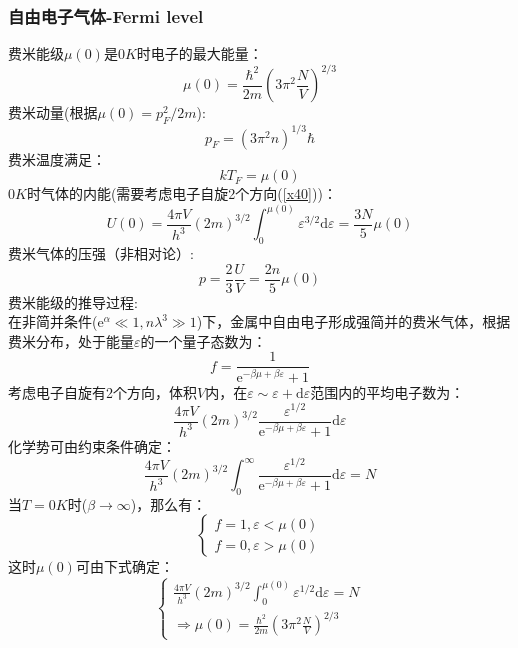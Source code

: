 \documentclass[12pt]{article}
\begin{document}
\subsubsection{自由电子气体-Fermi level}
\noindent
费米能级$\mu(0)$是$0K$时电子的最大能量：
\begin{equation}
	\mu(0)=\frac{\hbar^2}{2m}(3\pi^2\frac{N}{V})^{2/3}
\end{equation}
费米动量(根据$\mu(0)=p_F^2/2m$):
\begin{equation}
	p_F=(3\pi^2n)^{1/3}\hbar
\end{equation}
费米温度满足：
\begin{equation}
	kT_F=\mu(0)
\end{equation}
$0K$时气体的内能(需要考虑电子自旋2个方向(\ref{x40}))：
\begin{equation}
	U(0)=\frac{4\pi V}{h^3}(2m)^{3/2}\int_{0}^{\mu(0)} \varepsilon^{3/2}\mathrm{d}\varepsilon=\frac{3N}{5}\mu(0)
\end{equation}
费米气体的压强（非相对论）:
\begin{equation}
	p=\frac{2}{3}\frac{U}{V}=\frac{2n}{5}\mu(0)
\end{equation}
费米能级的推导过程:\\
在非简并条件($\mathrm{e}^\alpha\ll1, n\lambda^3\gg1$)下，金属中自由电子形成强简并的费米气体，根据费米分布，处于能量$\varepsilon$的一个量子态数为：
\begin{equation}
	f=\frac{1}{\mathrm{e}^{-\beta\mu+\beta\varepsilon}+1}
\end{equation}
考虑电子自旋有2个方向，体积$V$内，在$\varepsilon\sim\varepsilon+\mathrm{d}\varepsilon$范围内的平均电子数为：
\begin{equation}
	\frac{4\pi V}{h^3}(2m)^{3/2}\frac{\varepsilon^{1/2}}{\mathrm{e}^{-\beta\mu+\beta\varepsilon}+1}\mathrm{d}\varepsilon
\end{equation}
化学势可由约束条件确定：
\begin{equation}
		\frac{4\pi V}{h^3}(2m)^{3/2}\int_{0}^{\infty}\frac{\varepsilon^{1/2}}{\mathrm{e}^{-\beta\mu+\beta\varepsilon}+1}\mathrm{d}\varepsilon=N
\end{equation}
当$T=0K$时($\beta\to \infty$)，那么有：
\begin{equation}
	\left \{\begin{split}
		f=1,\varepsilon<\mu(0)\\
		f=0,\varepsilon>\mu(0)
	\end{split}\right.
\end{equation}
这时$\mu(0)$可由下式确定：
\begin{equation}
	\left\{
	\begin{split}
	\frac{4\pi V}{h^3}(2m)^{3/2}\int_{0}^{\mu(0)}{\varepsilon^{1/2}}\mathrm{d}\varepsilon=N\\
	\Rightarrow \mu(0)=\frac{\hbar^2}{2m}(3\pi^2\frac{N}{V})^{2/3}
\end{split}\right. 
\end{equation}
\end{document}
